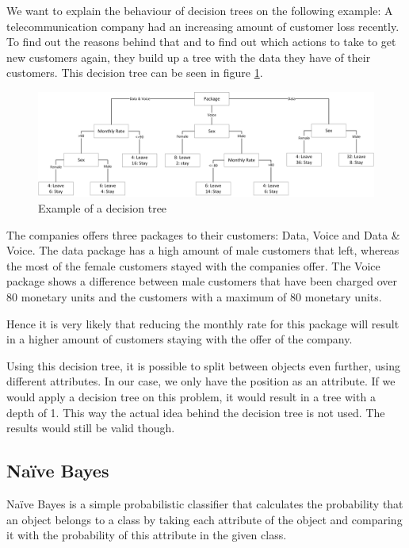 We want to explain the behaviour of decision trees on the following example: 
A telecommunication company had an increasing amount of customer loss recently. To find out the reasons behind that and to find out which actions to take to get new customers again, they build up a tree with the data they have of their customers. This decision tree can be seen in figure \ref{decisionTreeExample}.

\begin{figure}[ht!]
\centering
\includegraphics[width=\textwidth]{Images/ML/DecisionTreeExample.jpg}
\caption{Example of a decision tree \label{decisionTreeExample}}
\end{figure}

The companies offers three packages to their customers: Data, Voice and Data \& Voice. The data package has a high amount of male customers that left, whereas the most of the female customers stayed with the companies offer. The Voice package shows a difference between male customers that have been charged over 80 monetary units and the customers with a maximum of 80 monetary units.

Hence it is very likely that reducing the monthly rate for this package will result in a higher amount of customers staying with the offer of the company.

Using this decision tree, it is possible to split between objects even further, using different attributes. In our case, we only have the position as an attribute. If we would apply a decision tree on this problem, it would result in a tree with a depth of 1. This way the actual idea behind the decision tree is not used. The results would still be valid though.

\subsection{Na{\"i}ve Bayes}
\label{sec4.2.3}
Na{\"i}ve Bayes is a simple probabilistic classifier that calculates the probability that an object belongs to a class by taking each attribute of the object and comparing it with the probability of this attribute in the given class.

